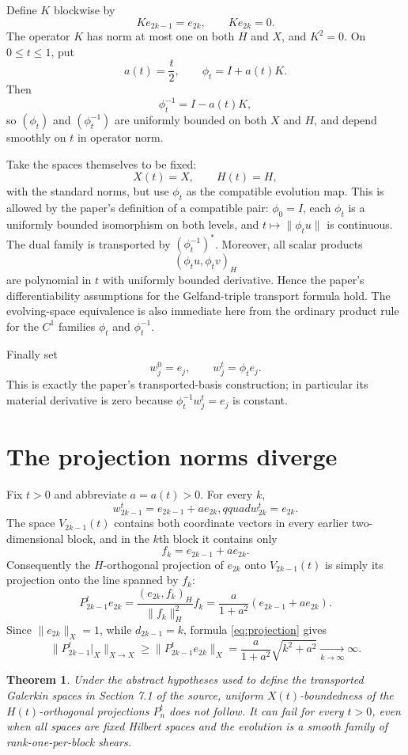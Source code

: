 \documentclass[11pt]{article}
\newtheorem{theorem}{Theorem}
\begin{document}
Define $K$ blockwise by
\[
 Ke_{2k-1}=e_{2k},\qquad Ke_{2k}=0.
\]
The operator $K$ has norm at most one on both $H$ and $X$, and $K^2=0$.  On $0\leq t\leq1$, put
\[
 a(t)=\frac t2,\qquad \phi_t=I+a(t)K.
\]
Then
\[
 \phi_t^{-1}=I-a(t)K,
\]
so $(\phi_t)$ and $(\phi_t^{-1})$ are uniformly bounded on both $X$ and $H$, and depend smoothly on $t$ in operator norm.

Take the spaces themselves to be fixed:
\[
 X(t)=X,\qquad H(t)=H,
\]
with the standard norms, but use $\phi_t$ as the compatible evolution map.  This is allowed by the paper's definition of a compatible pair: $\phi_0=I$, each $\phi_t$ is a uniformly bounded isomorphism on both levels, and $t\mapsto\|\phi_tu\|$ is continuous.  The dual family is transported by $(\phi_t^{-1})^*$.  Moreover, all scalar products
\[
 (\phi_tu,\phi_tv)_H
\]
are polynomial in $t$ with uniformly bounded derivative.  Hence the paper's differentiability assumptions for the Gelfand-triple transport formula hold.  The evolving-space equivalence is also immediate here from the ordinary product rule for the $C^1$ families $\phi_t$ and $\phi_t^{-1}$.

Finally set
\[
 w_j^0=e_j,\qquad w_j^t=\phi_t e_j.
\]
This is exactly the paper's transported-basis construction; in particular its material derivative is zero because $\phi_t^{-1}w_j^t=e_j$ is constant.

\section*{The projection norms diverge}
Fix $t>0$ and abbreviate $a=a(t)>0$.  For every $k$,
\[
 w_{2k-1}^t=e_{2k-1}+ae_{2k},qquad w_{2k}^t=e_{2k}.
\]
The space $V_{2k-1}(t)$ contains both coordinate vectors in every earlier two-dimensional block, and in the $k$th block it contains only
\[
 f_k=e_{2k-1}+ae_{2k}.
\]
Consequently the $H$-orthogonal projection of $e_{2k}$ onto $V_{2k-1}(t)$ is simply its projection onto the line spanned by $f_k$:
\begin{equation}\label{eq:projection}
 P_{2k-1}^t e_{2k}
 =\frac{(e_{2k},f_k)_H}{\|f_k\|_H^2}f_k
 =\frac{a}{1+a^2}(e_{2k-1}+ae_{2k}).
\end{equation}
Since $\|e_{2k}\|_X=1$, while $d_{2k-1}=k$, formula \eqref{eq:projection} gives
\[
 \|P_{2k-1}^t|_X\|_{X\to X}
 \geq\|P_{2k-1}^te_{2k}\|_X
 =\frac{a}{1+a^2}\sqrt{k^2+a^2}
 \xrightarrow[k\to\infty]{}\infty.
\]

\begin{theorem}
Under the abstract hypotheses used to define the transported Galerkin spaces in Section 7.1 of the source, uniform $X(t)$-boundedness of the $H(t)$-orthogonal projections $P_n^t$ does not follow.  It can fail for every $t>0$, even when all spaces are fixed Hilbert spaces and the evolution is a smooth family of rank-one-per-block shears.
\end{theorem}
\end{document}
